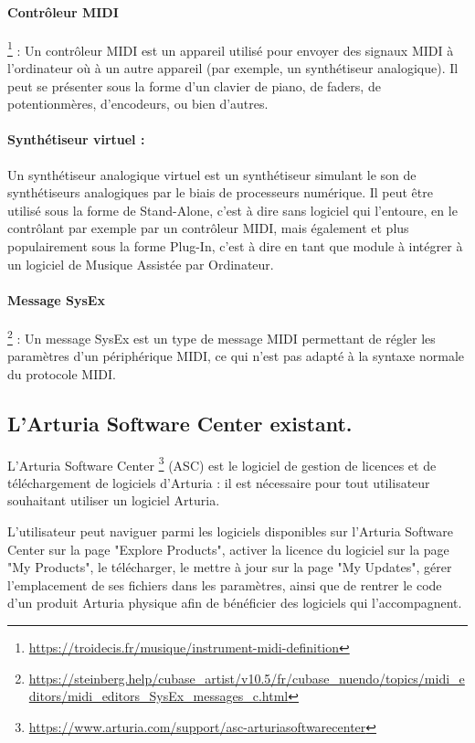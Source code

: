 \documentclass[francais]{rapportPFE}  %
\begin{document}
\paragraph{Contrôleur MIDI} \footnote{\url{https://troidecis.fr/musique/instrument-midi-definition}} 
:  Un contrôleur MIDI est un appareil utilisé pour envoyer des signaux MIDI à l'ordinateur où à un autre appareil (par exemple, un synthétiseur analogique). Il peut se présenter sous la forme d'un clavier de piano, de faders, de potentionmères, d'encodeurs, ou bien d'autres.
\paragraph{Synthétiseur virtuel :} Un synthétiseur analogique virtuel est un synthétiseur simulant le son de synthétiseurs analogiques par le biais de processeurs numérique. Il peut être utilisé sous la forme de Stand-Alone, c'est à dire sans logiciel qui l'entoure, en le contrôlant par exemple par un contrôleur MIDI, mais également et plus populairement sous la forme Plug-In, c'est à dire en tant que module à intégrer à un logiciel de Musique Assistée par Ordinateur.
\paragraph{Message SysEx}
\footnote{\url{https://steinberg.help/cubase_artist/v10.5/fr/cubase_nuendo/topics/midi_editors/midi_editors_SysEx_messages_c.html}}
: Un message SysEx est un type de message MIDI permettant de régler les paramètres d'un périphérique MIDI, ce qui n'est pas adapté à la syntaxe normale du protocole MIDI. 

\subsection{L'Arturia Software Center existant.}

L’Arturia Software Center
\footnote{\url{https://www.arturia.com/support/asc-arturiasoftwarecenter}}
 (ASC) est le logiciel de gestion de licences et de
téléchargement de logiciels d’Arturia : il est nécessaire pour tout utilisateur
souhaitant utiliser un logiciel Arturia. 

L'utilisateur peut naviguer parmi les logiciels disponibles sur l'Arturia Software Center sur la page "Explore Products", activer la licence du logiciel sur la page "My Products", le télécharger, le mettre à jour sur la page "My Updates", gérer l'emplacement de ses fichiers dans les paramètres, ainsi que de rentrer le code d'un produit Arturia physique afin de bénéficier des logiciels qui l'accompagnent.
\end{document}
